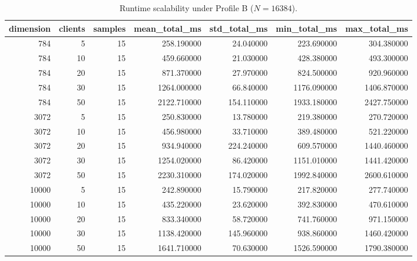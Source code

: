 \begin{table}
\caption{Runtime scalability under Profile B ($N=16384$).}
\label{tab:eval-runtime}
\begin{tabular}{rrrrrrr}
\toprule
dimension & clients & samples & mean_total_ms & std_total_ms & min_total_ms & max_total_ms \\
\midrule
784 & 5 & 15 & 258.190000 & 24.040000 & 223.690000 & 304.380000 \\
784 & 10 & 15 & 459.660000 & 21.030000 & 428.380000 & 493.300000 \\
784 & 20 & 15 & 871.370000 & 27.970000 & 824.500000 & 920.960000 \\
784 & 30 & 15 & 1264.000000 & 66.840000 & 1176.090000 & 1406.870000 \\
784 & 50 & 15 & 2122.710000 & 154.110000 & 1933.180000 & 2427.750000 \\
3072 & 5 & 15 & 250.830000 & 13.780000 & 219.380000 & 270.720000 \\
3072 & 10 & 15 & 456.980000 & 33.710000 & 389.480000 & 521.220000 \\
3072 & 20 & 15 & 934.940000 & 224.240000 & 609.570000 & 1440.460000 \\
3072 & 30 & 15 & 1254.020000 & 86.420000 & 1151.010000 & 1441.420000 \\
3072 & 50 & 15 & 2230.310000 & 174.020000 & 1992.840000 & 2600.610000 \\
10000 & 5 & 15 & 242.890000 & 15.790000 & 217.820000 & 277.740000 \\
10000 & 10 & 15 & 435.220000 & 23.620000 & 392.830000 & 470.610000 \\
10000 & 20 & 15 & 833.340000 & 58.720000 & 741.760000 & 971.150000 \\
10000 & 30 & 15 & 1138.420000 & 145.960000 & 938.860000 & 1460.420000 \\
10000 & 50 & 15 & 1641.710000 & 70.630000 & 1526.590000 & 1790.380000 \\
\bottomrule
\end{tabular}
\end{table}
